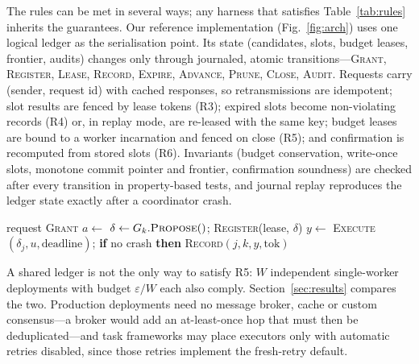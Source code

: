 \documentclass[11pt]{article}
\theoremstyle{definition}
\begin{document}
The rules can be met in several ways; any harness that satisfies Table~\ref{tab:rules} inherits the guarantees. Our reference implementation (Fig.~\ref{fig:arch}) uses one logical ledger as the serialisation point. Its state (candidates, slots, budget leases, frontier, audits) changes only through journaled, atomic transitions---\textsc{Grant}, \textsc{Register}, \textsc{Lease}, \textsc{Record}, \textsc{Expire}, \textsc{Advance}, \textsc{Prune}, \textsc{Close}, \textsc{Audit}. Requests carry (sender, request id) with cached responses, so retransmissions are idempotent; slot results are fenced by lease tokens (R3); expired slots become non-violating records (R4) or, in replay mode, are re-leased with the same key; budget leases are bound to a worker incarnation and fenced on close (R5); and confirmation is recomputed from stored slots (R6). Invariants (budget conservation, write-once slots, monotone commit pointer and frontier, confirmation soundness) are checked after every transition in property-based tests, and journal replay reproduces the ledger state exactly after a coordinator crash.

\begin{algorithm}[!htbp]
\caption{Worker loop. Any scheduling policy is valid under Theorem~\ref{thm:seq}.}\label{alg:worker}
\begin{algorithmic}[1]
\Loop
{} \State request \textsc{Grant} \EndIf
\State $a\gets$ 
 \State $\delta\gets G_k.\textsc{Propose}()$; \textsc{Register}(lease, $\delta$) 
    \State $y\gets$ \textsc{Execute}$(\delta_j,u,\text{deadline})$; \textbf{if} no crash \textbf{then} \textsc{Record}$(j,k,y,\text{tok})$ 
  \EndFor
\EndIf
\EndLoop
\end{algorithmic}
\end{algorithm}

A shared ledger is not the only way to satisfy R5: $W$ independent single-worker deployments with budget $\varepsilon/W$ each also comply. Section~\ref{sec:results} compares the two. Production deployments need no message broker, cache or custom consensus---a broker would add an at-least-once hop that must then be deduplicated---and task frameworks may place executors only with automatic retries disabled, since those retries implement the fresh-retry default.

\end{document}
